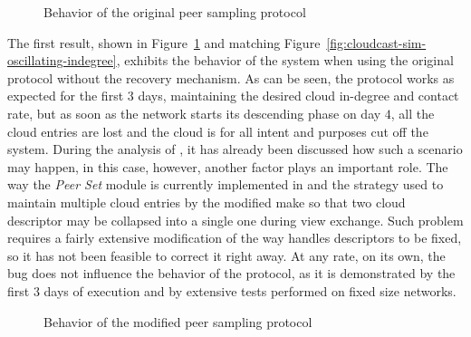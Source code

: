\begin{figure}[h!]
  \centering
  \caption{Behavior of the original peer sampling protocol}
  \label{fig:cloudcast-dynamic-original}
\end{figure}


The first result, shown in Figure~\ref{fig:cloudcast-dynamic-original}
and matching Figure~\ref{fig:cloudcast-sim-oscillating-indegree},
exhibits the behavior of the system when using the original protocol
without the recovery mechanism. As can be seen, the protocol works as
expected for the first $3$ days, maintaining the desired cloud
in-degree and contact rate, but as soon as the network starts its
descending phase on day $4$, all the cloud entries are lost and the
cloud is for all intent and purposes cut off the system. During the
analysis of \cloudcast, it has already been discussed how such a scenario
may happen, in this case, however, another factor plays an important
role. The way the \emph{Peer Set} module is currently implemented in
\grapes and the strategy used to maintain multiple cloud entries by
the modified \cyclon make so that two cloud descriptor may be
collapsed into a single one during view exchange. Such problem
requires a fairly extensive modification of the way \grapes handles
descriptors to be fixed, so it has not been feasible to correct it right
away. At any rate, on its own, the bug does not influence the behavior of
the protocol, as it is demonstrated by the first $3$ days of execution
and by extensive tests performed on fixed size networks.

\begin{figure}[h!]
  \centering
  \caption{Behavior of the modified peer sampling protocol}
  \label{fig:cloudcast-dynamic-additions}
\end{figure}


